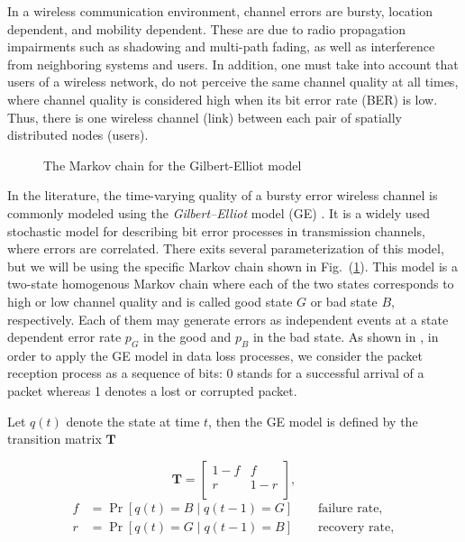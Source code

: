 In a wireless communication environment, channel errors are bursty, location
dependent, and mobility dependent. These are due to radio propagation
impairments such as shadowing and multi-path fading, as well as interference
from neighboring systems and users. In addition, one must take into account that
users of a wireless network, do not perceive the same channel quality at all
times, where channel quality is considered high when its bit error rate (BER) is
low. Thus, there is one wireless channel (link) between each pair of spatially
distributed nodes (users). 

\begin{figure}[htb]
  \centering
   
  \caption{The Markov chain for the Gilbert-Elliot model}
  \label{fig:GE_FSM}
\end{figure}

In the literature, the time-varying quality of a bursty error wireless channel
is commonly modeled using the \textit{Gilbert–Elliot} model (GE)
\cite{gilbert1960capacity, elliott1963estimates}. It is a widely used stochastic
model for describing bit error processes in transmission channels, where errors
are correlated. There exits several parameterization of this model, but we will
be using the specific Markov chain shown in Fig.~(\ref{fig:GE_FSM}). This model
is a two-state homogenous Markov chain where each of the two states corresponds
to high or low channel quality and is called good state $G$ or bad state $B$,
respectively. Each of them may generate errors as independent events at a state
dependent error rate $p_G$ in the good and $p_B$ in the bad state. As shown in
\cite{hasslinger2008gilbert}, in order to apply the GE model in data loss
processes, we consider the packet reception process as a sequence of bits: 0
stands for a successful arrival of a packet whereas 1 denotes a lost or
corrupted packet.

Let $q(t)$ denote the state at time $t$, then the GE model is defined by the
transition matrix $\boldsymbol{T}$

\begin{equation}
  \boldsymbol{T} = 
  \begin{bmatrix}
    1-f & f \\
    r & 1-r \\
  \end{bmatrix},
\end{equation}
\begin{align}
  \label{eq:GE_transition}
  f &= \Pr[q(t) = B \mid q(t-1) = G] \qquad \textrm{failure rate}, \\
  r &= \Pr[q(t) = G \mid q(t-1) = B] \qquad \textrm{recovery rate},
\end{align}

